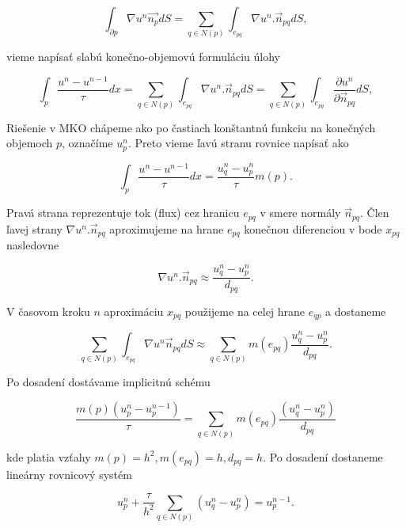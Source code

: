 \documentclass[a4paper,11pt,oneside]{article}%
\begin{document}
\begin{equation} 
\int_{\partial p} \nabla u^n \vec{n_p}dS = \sum_{q\in N(p)}\int_{e_{pq}} \nabla u^n . \vec{n}_{pq}dS,
\end{equation}

vieme napísať slabú konečno-objemovú formuláciu úlohy

\begin{equation} 
\int_p\frac{u^n - u^{n-1}}{\tau} dx = \sum_{q\in N(p)}\int_{e_{pq}} \nabla u^n . \vec{n}_{pq}dS = \sum_{q\in N(p)}\int_{e_{pq}} \frac{\partial u^n}{\partial \vec{n}_{pq}} dS,
\end{equation}

Riešenie v MKO chápeme ako po častiach konštantnú funkciu na konečných objemoch $p$, označíme $u_p^n$. Preto vieme ľavú stranu rovnice napísať ako 

\begin{equation} 
\int_p\frac{u^n - u^{n-1}}{\tau} dx = \frac{u^n_q - u^n_p}{\tau} m(p).
\end{equation}

Pravá strana reprezentuje tok (flux) cez hranicu $e_{pq}$ v smere normály $\vec{n}_{pq}$. Člen ľavej strany $\nabla u^n . \vec{n}_{pq}$ aproximujeme na hrane $e_{pq}$ konečnou diferenciou v bode $x_{pq}$ nasledovne

\begin{equation}
\nabla u^n . \vec{n}_{pq} \approx \frac{u^n_q - u^n_p}{d_{pq}}.
\end{equation}

V časovom kroku $n$ aproximáciu $x_{pq}$ použijeme na celej hrane $e_{qp}$ a dostaneme

\begin{equation}
\sum_{q\in N(p)} \int_{e_{pq}} \nabla u^n \vec{n}_{pq} dS \approx \sum_{q\in N(p)} m(e_{pq})\frac{u^n_q - u^n_p}{d_{pq}}.
\end{equation}

Po dosadení dostávame implicitnú schému  

\begin{equation}
\frac{m(p)(u_p^n -u_p^{n - 1})}{\tau} = \sum_{q \in N(p)} m(e_{pq})\frac{(u_q^n - u_p^n)}{d_{pq}}
\end{equation}

kde platia vzťahy $m(p) = h^2, m(e_{pq}) = h, d_{pq} = h$. Po dosadení dostaneme lineárny rovnicový systém

\begin{equation}
u_p^n + \frac{\tau}{h^2}\sum_{q \in N(p)} (u_q^n - u_p^n) = u_p^{n - 1}.
\end{equation}
\end{document}
